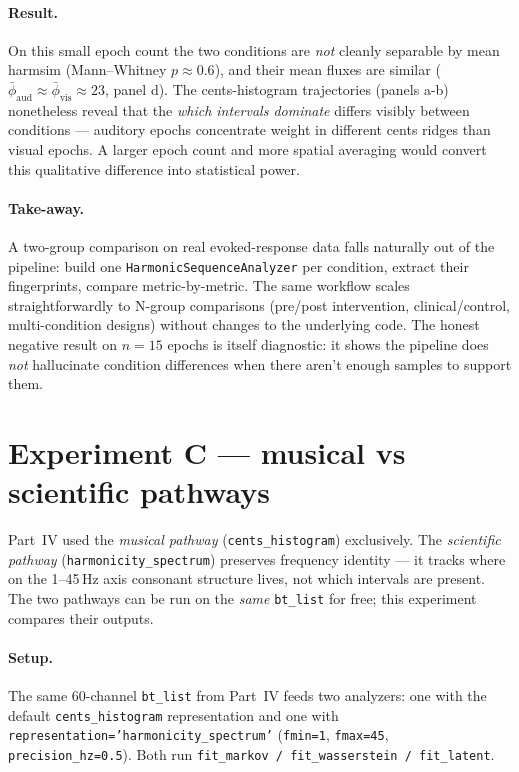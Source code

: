 \documentclass[11pt,a4paper]{article}
\begin{document}
\paragraph{Result.}  On this small epoch count the two conditions are
\emph{not} cleanly separable by mean harmsim
(Mann--Whitney $p \approx 0.6$), and their mean fluxes are similar
($\bar\phi_{\text{aud}} \approx \bar\phi_{\text{vis}} \approx 23$,
panel d). The cents-histogram trajectories (panels a-b) nonetheless
reveal that the \emph{which intervals dominate} differs visibly between
conditions --- auditory epochs concentrate weight in different cents
ridges than visual epochs. A larger epoch count and more spatial
averaging would convert this qualitative difference into statistical
power.

\paragraph{Take-away.}  A two-group comparison on real evoked-response
data falls naturally out of the pipeline: build one
\texttt{HarmonicSequenceAnalyzer} per condition, extract their
fingerprints, compare metric-by-metric. The same workflow scales
straightforwardly to N-group comparisons (pre/post intervention,
clinical/control, multi-condition designs) without changes to the
underlying code. The honest negative result on $n=15$ epochs is itself
diagnostic: it shows the pipeline does \emph{not} hallucinate
condition differences when there aren't enough samples to support them.

\section{Experiment C --- musical vs scientific pathways}

\begin{insight}
Part~IV used the \emph{musical pathway} (\texttt{cents\_histogram})
exclusively. The \emph{scientific pathway}
(\texttt{harmonicity\_spectrum}) preserves frequency identity --- it
tracks where on the 1--45\,Hz axis consonant structure lives, not which
intervals are present. The two pathways can be run on the \emph{same}
\texttt{bt\_list} for free; this experiment compares their outputs.
\end{insight}

\paragraph{Setup.}  The same 60-channel \texttt{bt\_list} from Part~IV
feeds two analyzers: one with the default \texttt{cents\_histogram}
representation and one with
\texttt{representation='harmonicity\_spectrum'} (\texttt{fmin=1},
\texttt{fmax=45}, \texttt{precision\_hz=0.5}). Both run
\texttt{fit\_markov / fit\_wasserstein / fit\_latent}.
\end{document}
